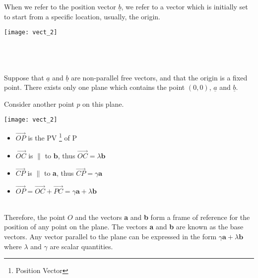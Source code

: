 \documentclass{standalone}
\begin{document}
	When we refer to the position vector  $\underline{b}$, we refer to a vector which is initially set to start from a specific location, usually, the origin.\\
	\setlength{\columnseprule}{0pt} 
	\begin{multicols}{2}
		\begin{center}
			\texttt{[image: vect\_2]} 
		\end{center}
		\begin{center}
			~\\~\\~\\
			Suppose that  $\underline{a}$ and  $\underline{b}$ are non-parallel free vectors, and that the origin is a fixed point. There exists only one plane which contains the point $(0,0)$,  $\underline{a}$ and  $\underline{b}$.
		\end{center}
		
	\end{multicols}
	
	Consider another point $p$ on this plane.
	\begin{multicols}{2}
		\begin{center}
			\texttt{[image: vect\_2]} 
		\end{center}
		\begin{itemize}
			\item{$\vec{OP}$ is the PV \footnote{Position Vector} of P}
			
			\item{	$\overrightarrow{OC}$ is $\parallel$ to $\textbf{b}$, thus $\overrightarrow{OC} = \lambda \textbf{b}$}
			\item{$\overrightarrow{CP}$ is $\parallel$ to \textbf{a}, thus $\overrightarrow{CP} = \gamma \textbf{a}$}
			\item{$\overrightarrow{OP} = \overrightarrow{OC} + \overrightarrow{PC}	 =\gamma \textbf{a} + \lambda \textbf{b}$}
		\end{itemize}
		
	\end{multicols}
	~\\
	
	Therefore, the point $O$ and the vectors \textbf{a} and \textbf{b} form a frame of reference for the position of any point on the plane. The vectors \textbf{a} and \textbf{b} are known as the base vectors. Any vector parallel to the plane can be expressed in the form $\gamma \textbf{a} + \lambda \textbf{b}$ where $\lambda$ and $\gamma$ are scalar quantities.\\
	
\end{document}
